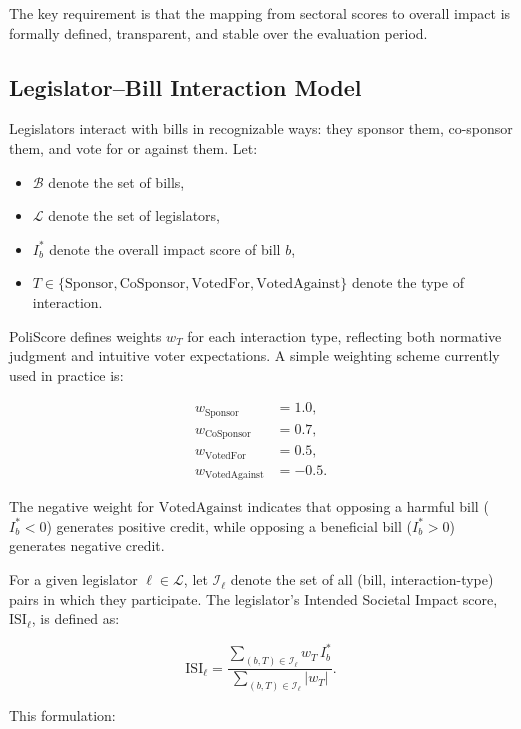 \documentclass[12pt]{article}
\begin{document}
The key requirement is that the mapping from sectoral scores to overall impact is formally defined, transparent, and stable
over the evaluation period.

\subsection{Legislator--Bill Interaction Model}

Legislators interact with bills in recognizable ways: they sponsor them, co-sponsor them, and vote for or against them.
Let:

\begin{itemize}
    \item \(\mathcal{B}\) denote the set of bills,
    \item \(\mathcal{L}\) denote the set of legislators,
    \item \(I_b^{\ast}\) denote the overall impact score of bill \(b\),
    \item \(T \in \{\text{Sponsor}, \text{CoSponsor}, \text{VotedFor}, \text{VotedAgainst}\}\) denote the type of interaction.
\end{itemize}

PoliScore defines weights \(w_T\) for each interaction type, reflecting both normative judgment and intuitive voter
expectations. A simple weighting scheme currently used in practice is:

\begin{align*}
w_{\text{Sponsor}} &= 1.0, \\
w_{\text{CoSponsor}} &= 0.7, \\
w_{\text{VotedFor}} &= 0.5, \\
w_{\text{VotedAgainst}} &= -0.5.
\end{align*}

The negative weight for \(\text{VotedAgainst}\) indicates that opposing a harmful bill (\(I_b^{\ast} < 0\)) generates
positive credit, while opposing a beneficial bill (\(I_b^{\ast} > 0\)) generates negative credit.

For a given legislator \(\ell \in \mathcal{L}\), let \(\mathcal{I}_{\ell}\) denote the set of all (bill, interaction-type)
pairs in which they participate. The legislator's Intended Societal Impact score, \(\text{ISI}_{\ell}\), is defined as:

\[
\text{ISI}_{\ell} =
\frac{\sum_{(b, T) \in \mathcal{I}_{\ell}} w_T \, I_b^{\ast}}
     {\sum_{(b, T) \in \mathcal{I}_{\ell}} |w_T|}.
\]

This formulation:
\end{document}
